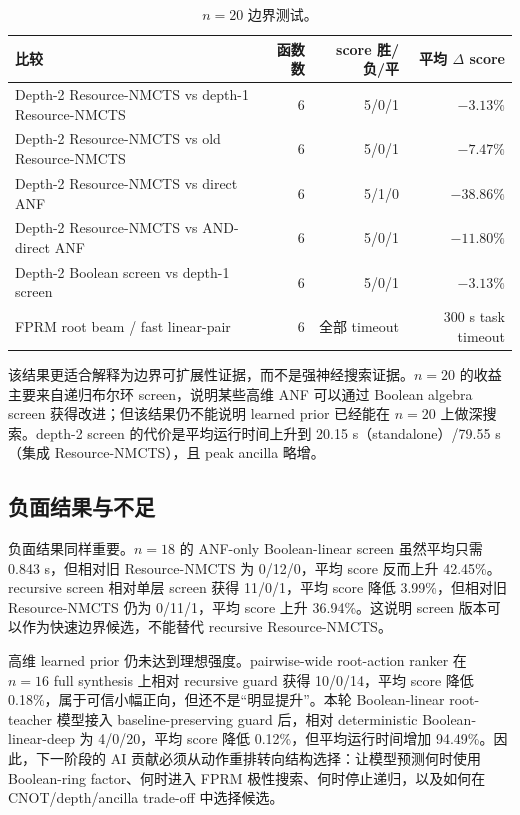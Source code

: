 \documentclass[UTF8,fontset=macnew,11pt]{ctexart}
\newcommand{\method}{Resource-NMCTS}
\begin{document}
\begin{table}[t]
\centering
\small
\caption{$n=20$ 边界测试。}
\label{tab:n20}
\begin{tabularx}{\linewidth}{>{\raggedright\arraybackslash}Xrrr}
\toprule
比较 & 函数数 & score 胜/负/平 & 平均 $\Delta$ score \\
\midrule
Depth-2 \method{} vs depth-1 \method{} & 6 & 5/0/1 & $-3.13\%$ \\
Depth-2 \method{} vs old \method{} & 6 & 5/0/1 & $-7.47\%$ \\
Depth-2 \method{} vs direct ANF & 6 & 5/1/0 & $-38.86\%$ \\
Depth-2 \method{} vs AND-direct ANF & 6 & 5/0/1 & $-11.80\%$ \\
Depth-2 Boolean screen vs depth-1 screen & 6 & 5/0/1 & $-3.13\%$ \\
FPRM root beam / fast linear-pair & 6 & 全部 timeout & 300 s task timeout \\
\bottomrule
\end{tabularx}
\end{table}

该结果更适合解释为边界可扩展性证据，而不是强神经搜索证据。$n=20$ 的收益主要来自递归布尔环 screen，说明某些高维 ANF 可以通过 Boolean algebra screen 获得改进；但该结果仍不能说明 learned prior 已经能在 $n=20$ 上做深搜索。depth-2 screen 的代价是平均运行时间上升到 20.15 s（standalone）/79.55 s（集成 \method{}），且 peak ancilla 略增。

\subsection{负面结果与不足}

负面结果同样重要。$n=18$ 的 ANF-only Boolean-linear screen 虽然平均只需 0.843 s，但相对旧 \method{} 为 0/12/0，平均 score 反而上升 42.45\%。recursive screen 相对单层 screen 获得 11/0/1，平均 score 降低 3.99\%，但相对旧 \method{} 仍为 0/11/1，平均 score 上升 36.94\%。这说明 screen 版本可以作为快速边界候选，不能替代 recursive Resource-NMCTS。

高维 learned prior 仍未达到理想强度。pairwise-wide root-action ranker 在 $n=16$ full synthesis 上相对 recursive guard 获得 10/0/14，平均 score 降低 0.18\%，属于可信小幅正向，但还不是“明显提升”。本轮 Boolean-linear root-teacher 模型接入 baseline-preserving guard 后，相对 deterministic Boolean-linear-deep 为 4/0/20，平均 score 降低 0.12\%，但平均运行时间增加 94.49\%。因此，下一阶段的 AI 贡献必须从动作重排转向结构选择：让模型预测何时使用 Boolean-ring factor、何时进入 FPRM 极性搜索、何时停止递归，以及如何在 CNOT/depth/ancilla trade-off 中选择候选。
\end{document}

